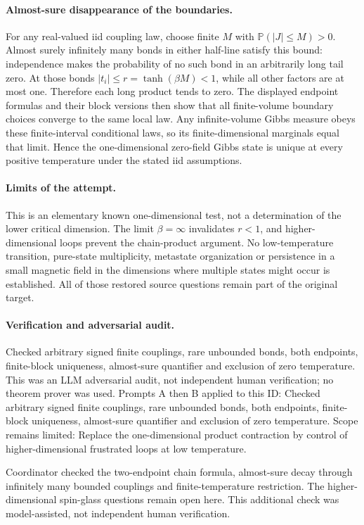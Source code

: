 \documentclass[11pt]{article}
\begin{document}
\paragraph{Almost-sure disappearance of the boundaries.}For any real-valued iid coupling law, choose finite \(M\) with \(\mathbb P(|J|\le M)>0\). Almost surely infinitely many bonds in either half-line satisfy this bound: independence makes the probability of no such bond in an arbitrarily long tail zero. At those bonds \(|t_i|\le r=\tanh(\beta M)<1\), while all other factors are at most one. Therefore each long product tends to zero. The displayed endpoint formulas and their block versions then show that all finite-volume boundary choices converge to the same local law. Any infinite-volume Gibbs measure obeys these finite-interval conditional laws, so its finite-dimensional marginals equal that limit. Hence the one-dimensional zero-field Gibbs state is unique at every positive temperature under the stated iid assumptions.
\paragraph{Limits of the attempt.}This is an elementary known one-dimensional test, not a determination of the lower critical dimension. The limit \(\beta=\infty\) invalidates \(r<1\), and higher-dimensional loops prevent the chain-product argument. No low-temperature transition, pure-state multiplicity, metastate organization or persistence in a small magnetic field in the dimensions where multiple states might occur is established. All of those restored source questions remain part of the original target.

\paragraph{Verification and adversarial audit.}
Checked arbitrary signed finite couplings, rare unbounded bonds, both endpoints, finite-block uniqueness, almost-sure quantifier and exclusion of zero temperature. This was an LLM adversarial audit, not independent human verification; no theorem prover was used. Prompts A then B applied to this ID: Checked arbitrary signed finite couplings, rare unbounded bonds, both endpoints, finite-block uniqueness, almost-sure quantifier and exclusion of zero temperature. Scope remains limited: Replace the one-dimensional product contraction by control of higher-dimensional frustrated loops at low temperature.

Coordinator checked the two-endpoint chain formula, almost-sure decay through infinitely many bounded couplings and finite-temperature restriction. The higher-dimensional spin-glass questions remain open here. This additional check was model-assisted, not independent human verification.
\end{document}
